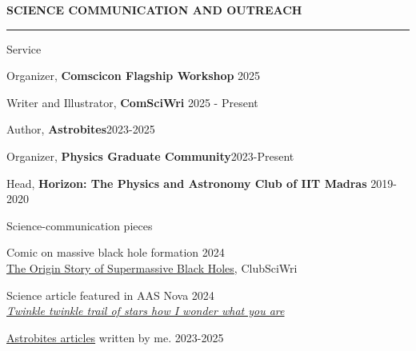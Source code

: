 \documentclass{resume} %
\renewenvironment{rSection}[1]{
\sectionskip
\textbf{\textcolor{C2}{\MakeUppercase{#1}}}
\sectionlineskip
\hrule
\begin{list}{}{
\setlength{\leftmargin}{1.5em}
}
\item[]
}{
\end{list}
}
\begin{document}
\begin{rSection}{Science communication and outreach}
    \begin{rSubsection}{Service}{}{}{}
    \item Organizer, {\color{C3} \textbf{Comscicon Flagship Workshop}} \hfill 2025
    \item Writer and Illustrator, {\color{C3} \textbf{ComSciWri}} \hfill 2025 - Present
    \item Author, {\color{C3} \textbf{Astrobites}}\hfill 2023-2025
    \item Organizer, {\color{C3} \textbf{Physics Graduate Community}}\hfill 2023-Present
    \item Head, {\color{C3} \textbf{Horizon: The Physics and Astronomy Club of IIT Madras}} \hfill 2019-2020
    \end{rSubsection}

    \begin{rSubsection}{Science-communication pieces}{}{}{}
    \item Comic on massive black hole formation \hfill 2024\\
    \href{https://sciwri.club/archives/13482}{The Origin Story of Supermassive Black Holes}, ClubSciWri
    \item Science article featured in AAS Nova \hfill 2024\\ \href{https://aasnova.org/2023/09/05/twinkle-twinkle-trail-of-stars-how-i-wonder-what-you-are/}{\em Twinkle twinkle trail of stars how I wonder what you are}
    \item \href{https://astrobites.org/author/psatheesh/}{Astrobites articles} written by me. \hfill 2023-2025
    \end{rSubsection}


\end{rSection}
\end{document}
